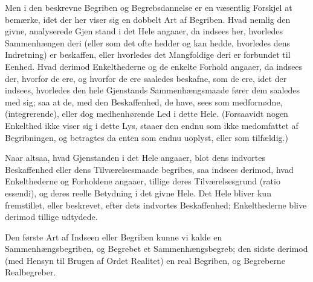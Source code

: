 \documentclass[12pt]{book}
\def\textit#1{#1}%
\def\emph#1{#1}%
\newcommand{\opage}[1]{\marginnote{\footnotesize\textit{[#1]}}}
\begin{document}
Men i den beskrevne Begriben og Begrebsdannelse er en væsentlig Forskjel at
bemærke, idet der her viser sig en dobbelt Art af Begriben. Hvad nemlig den
givne, analyserede Gjen%
\opage{45}stand i det Hele angaaer, da indsees her, hvorledes Sammenhængen deri (eller
som det ofte hedder og kan hedde, hvorledes dens Indretning) er beskaffen,
eller hvorledes det Mangfoldige deri er forbundet til Eenhed. Hvad derimod
Enkelthederne og de enkelte Forhold angaaer, da indsees der, hvorfor de ere,
og hvorfor de ere saaledes beskafne, som de ere, idet der indsees, hvorledes
den hele Gjenstands Sammenhængsmaade fører dem saaledes med sig; saa at de,
med den Beskaffenhed, de have, sees som medfornødne, (integrerende), eller dog
medhenhørende Led i dette Hele. (Forsaavidt nogen Enkelthed ikke viser sig i
dette Lys, staaer den endnu som ikke medomfattet af Begribningen, og betragtes
da enten som endnu uoplyst, eller som tilfældig.)

Naar altsaa, hvad Gjenstanden i det Hele angaaer, blot dens \emph{indvortes
Beskaffenhed} eller dens \emph{Tilværelsesmaade} begribes, saa indsees derimod,
hvad Enkelthederne og Forholdene angaaer, tillige deres
\emph{Tilværelsesgrund} (\textit{ratio essendi}), og deres \emph{reelle
Betydning} i det givne Hele. Det Hele bliver kun fremstillet, eller beskrevet,
efter dets indvortes Beskaffenhed; Enkelthederne blive derimod tillige
\emph{udtydede}.

Den første Art af Indseen eller Begriben kunne vi kalde en
\emph{Sammenhængsbegriben}, og Begrebet et \emph{Sammenhængsbegreb}; den sidste
derimod (med Hensyn til Brugen af Ordet Realitet) en \emph{real Begriben}, og
Begreberne \emph{Realbegreber}.
\end{document}
